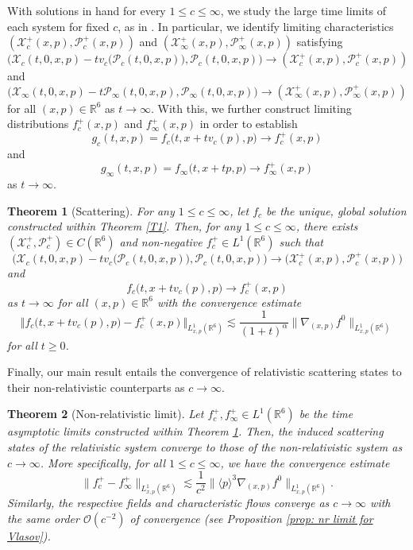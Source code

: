 \documentclass[reqno, 11pt, letterpaper]{amsart}
\newtheorem{theorem}{Theorem}
\theoremstyle{remark}
\newcommand{\R}{\mathbb{R}}
\numberwithin{equation}{section}
\numberwithin{theorem}{section}
\numberwithin{table}{section}
\numberwithin{figure}{section}
\begin{document}
With solutions in hand for every $1 \leq c \leq \infty$, we study the large time limits of each system for fixed $c$, as in \cite{ChoiHa, ChoiKwon, HuangKwon,IPWW22, Pankavich1, Wang23}.
In particular, we identify limiting characteristics $(\mathcal{X}_c^+(x,p), \mathcal{P}_c^+(x,p))$ and $(\mathcal{X}_\infty^+(x,p), \mathcal{P}_\infty^+(x,p))$ satisfying
$$\Big(\mathcal{X}_c(t,0,x,p)-tv_c\big(\mathcal{P}_c(t,0,x,p)\big), \mathcal{P}_c(t,0,x,p)\Big) \to (\mathcal{X}_c^+(x,p), \mathcal{P}_c^+(x,p))$$
and
$$\Big(\mathcal{X}_\infty(t,0,x,p)-t\mathcal{P}_\infty(t,0,x,p), \mathcal{P}_\infty(t,0,x,p)\Big) \to (\mathcal{X}_\infty^+(x,p), \mathcal{P}_\infty^+(x,p))$$
for all $(x,p) \in \R^6$ as $t \to \infty$.
With this, we further construct limiting distributions
$f_c^+(x,p)$ and $f_\infty^+(x,p)$ in order to establish
$$g_c(t,x,p) = f_c\Big(t,x+tv_c(p),p\Big) \to f_c^+(x,p)$$
and
$$g_\infty(t,x,p) = f_\infty\Big(t,x+tp,p\Big) \to f_\infty^+(x,p)$$
as $t \to \infty$.

\begin{theorem}[Scattering]
\label{T2}
For any $1 \leq c \leq \infty$, let $f_c$ be the unique, global solution constructed within Theorem \ref{T1}.
Then, for any $1 \leq c \leq \infty$, there exists $(\mathcal{X}_c^+,  \mathcal{P}_c^+) \in C(\mathbb{R}^6)$ and non-negative $f_c^+ \in L^1(\mathbb{R}^6)$ such that 
$$\Big(\mathcal{X}_c(t,0,x,p)-tv_c\big(\mathcal{P}_c(t,0,x,p)\big), \mathcal{P}_c(t,0,x,p)\Big) \to \big(\mathcal{X}_c^+(x,p), \mathcal{P}_c^+(x,p)\big)$$
and
$$f_c\Big(t,x+tv_c(p),p\Big) \to f_c^+(x,p)$$
as $t \to \infty$ for all $(x,p) \in \R^6$  with the convergence estimate
$$ \Big\Vert f_c\Big(t,x+tv_c(p),p\Big) - f_c^+(x,p)\Big\Vert_{L^1_{x,p}(\mathbb{R}^6)} \lesssim \frac{1}{(1+t)^\alpha}\|\nabla_{(x,p)}f^0\|_{L_{x,p}^1(\mathbb{R}^6)}$$
for all $t \geq 0$.
\end{theorem}


Finally, our main result entails the convergence of relativistic scattering states to their non-relativistic counterparts as $c \to \infty$.
\begin{theorem}[Non-relativistic limit]
\label{T3}
Let $f_c^+, f_\infty^+ \in L^1\left (\mathbb{R}^6 \right)$ be the time asymptotic limits constructed within Theorem \ref{T2}. Then, the induced scattering states of the relativistic system converge to those of the non-relativistic system as $c \to \infty$. More specifically, for all $1 \leq c \leq \infty$, we have the convergence estimate
$$\|f_c^+-f_\infty^+\|_{L_{x,p}^1(\mathbb{R}^6)}\lesssim\frac{1}{c^2}\|\langle p \rangle^3\nabla_{(x,p)}f^0\|_{L_{x,p}^1(\mathbb{R}^6)}.$$
Similarly, the respective fields and characteristic flows converge as $c \to \infty$ with the same order $\mathcal{O}\left (c^{-2} \right )$ of convergence (see Proposition \ref{prop: nr limit for Vlasov}).
\end{theorem}
\end{document}
